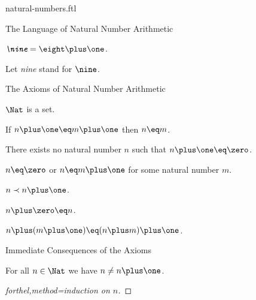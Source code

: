 \documentclass{naproche-library}
\begin{document}
\begin{smodule}[title=Natural Numbers]{natural-numbers.ftl}
\begin{sfragment}{The Language of Natural Number Arithmetic}
  \begin{definition}[forthel,id=NineSig]
    $\emph{\nine}=\eight\plus\one$.

    Let \emph{nine} stand for $\nine$.
  \end{definition}

\end{sfragment}

\begin{sfragment}{The Axioms of Natural Number Arithmetic}
  \begin{axiom}[forthel,title=Infinity Axiom,id=NatIsSetAx]
    $\Nat$ is a set.
  \end{axiom}

  \begin{axiom}[forthel,title=Peano Axiom I,id=PlusIsInjectiveAx]
    If $n\plus\one\eq m\plus\one$ then $n\eq m$.
  \end{axiom}
  \begin{axiom}[forthel,title=Peano Axiom II,id=ZeroIsNoSuccessorAx]
    There exists no natural number $n$ such that $n\plus\one\eq\zero$.
  \end{axiom}

  \begin{axiom}[forthel,title=Peano Axiom III,id=NatNumberIsZeroOrSuccessorAx]
    $n\eq\zero$ or $n\eq m\plus\one$ for some natural number $m$.
  \end{axiom}

  \begin{axiom}[forthel,title=Induction Axiom,id=InductionAx]
    $n\prec n\plus\one$.
  \end{axiom}

  \begin{axiom}[forthel,title=Addition Axiom I,id=AdditionWithZeroAx]
    $n\plus\zero\eq n$.
  \end{axiom}

  \begin{axiom}[forthel,title=Addition Axiom II,id=AdditionWithSuccessorAx]
    $n\plus(m\plus\one)\eq(n\plus m)\plus\one$.
  \end{axiom}
\end{sfragment}

\begin{sfragment}{Immediate Consequences of the Axioms}
  \begin{proposition}[forthel,id=NatNumberIsNotItsOwnSuccessorProp]
    For all $n\in\Nat$ we have $n\neq n\plus\one$.
  \end{proposition}
  \begin{proof}[forthel,method=induction on $n$]\end{proof}


\end{sfragment}
\end{smodule}
\end{document}
